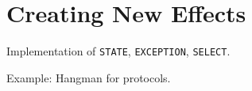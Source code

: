 \section{Creating New Effects}

\label{sect:impleff}

Implementation of \texttt{STATE}, \texttt{EXCEPTION}, \texttt{SELECT}.

Example: Hangman for protocols.
